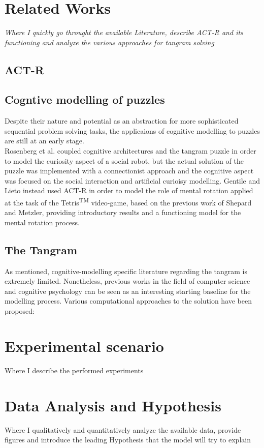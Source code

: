 \documentclass[a4paper,singleside,12pt]{report} %
\begin{document}
    
    \chapter{Related Works}
    \textit{Where I quickly go throught the available Literature, describe ACT-R and its functioning and analyze the 
	various approaches for tangram solving}
	\section{ACT-R}
	\section{Cogntive modelling of puzzles}
	Despite their nature and potential as an abstraction for more sophisticated sequential problem solving tasks,
	the applicaions of cognitive modelling to puzzles are still at an early stage.\\
	Rosenberg et al. \cite{social-robot} coupled cognitive architectures and the tangram puzzle	in order to model 
	the curiosity aspect of a social robot, but the actual solution of the puzzle was implemented with a connectionist approach
	and the cognitive aspect was focused on the social interaction and artificial curioisy modelling.
	Gentile and Lieto \cite{GENTILE20221} instead used ACT-R in order to model the role of mental rotation applied at the task of
	the Tetris\textsuperscript{TM} video-game, based on the previous work of Shepard and Metzler\cite{shepard1971mental}, providing
	introductory results and a functioning model for the mental rotation process.
	\section{The Tangram}
	As mentioned, cognitive-modelling specific literature regarding the tangram is extremely limited. Nonetheless, previous works in the field
	of computer science and cognitive psychology can be seen as an interesting starting baseline for the modelling process.
	Various computational approaches to the solution have been proposed: 
    \chapter{Experimental scenario}
    Where I describe the performed experiments
    \chapter{Data Analysis and Hypothesis}
    Where I qualitatively and quantitatively analyze the available data, provide figures and introduce
    the leading Hypothesis that the model will try to explain
\end{document}
